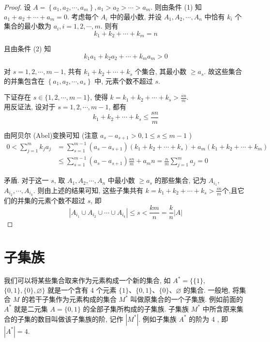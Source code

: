 \begin{proof}
	设 $A=\left\{a_{1}, a_{2}, \cdots, a_{m}\right\}, a_{1}>a_{2}>\cdots>a_{m}$. 则由条件 (1) 知 $a_{1}+a_{2}+\cdots+a_{m}=0$. 考虑每个 $A_{i}$ 中的最小数, 并设 $A_{1}, A_{2}, \cdots, A_{n}$ 中恰有 $k_{i}$ 个集合的最小数为 $a_{i}, i=1,2, \cdots, m$. 则有
	$$
		k_{1}+k_{2}+\cdots+k_{m}=n
	$$

	且由条件 (2) 知
	$$
		k_{1} a_{1}+k_{2} a_{2}+\cdots+k_{m} a_{m}>0
	$$

	对 $s=1,2, \cdots, m-1$, 共有 $k_{1}+k_{2}+\cdots+k_{s}$ 个集合, 其最小数 $\geqslant a_{s}$. 故这些集合的并集包含在 $\left\{a_{1}, a_{2}, \cdots, a_{s}\right\}$ 中, 元素个数不超过 $s$.

	下证存在 $s \in\{1,2, \cdots, m-1\}$, 使得 $k=k_{1}+k_{2}+\cdots+k_{s}>\frac{s n}{m}$.\\
	用反证法, 设对于 $s=1,2, \cdots, m-1$, 都有
	$$
		k_{1}+k_{2}+\cdots+k_{s} \leqslant \frac{s n}{m}
	$$

	由阿贝尔 (Abel)变换可知 (注意 $a_{s}-a_{s+1}>0,1 \leqslant s \leqslant m-1$ )
	$$
		\begin{aligned}
			0<\sum_{j=1}^{m} k_{j} a_{j} & =\sum_{s=1}^{m-1}\left(a_{s}-a_{s+1}\right)\left(k_{1}+k_{2}+\cdots+k_{s}\right)+a_{m}\left(k_{1}+k_{2}+\cdots+k_{m}\right) \\
			                             & \leqslant \sum_{s=1}^{m-1}\left(a_{s}-a_{s+1}\right) \frac{s n}{m}+a_{m} n=\frac{n}{m} \sum_{j=1}^{m} a_{j}=0
		\end{aligned}
	$$

	矛盾. 对于这一 $s$, 取 $A_{1}, A_{2}, \cdots, A_{n}$ 中最小数 $\geqslant a_{s}$ 的那些集合, 记为 $A_{i_{1}}$, $A_{i_{2}}, \cdots, A_{i_{k}}$. 则由上述的结果可知, 这些子集共有 $k=k_{1}+k_{2}+\cdots+k_{s}>\frac{s n}{m}$个,且它们的并集的元素个数不超过 $s$, 即
	$$
		\left|A_{i_{1}} \cup A_{i_{2}} \cup \cdots \cup A_{i_{k}}\right| \leqslant s<\frac{k m}{n}=\frac{k}{n}|A|
	$$
\end{proof}

\section{子集族}
我们可以将某些集合取来作为元素构成一个新的集合, 如 $A^{*}=\{\{1\}$, $\{0,1\},\{0\}, \varnothing\}$ 就是一个含有 4 个元素 $\{1\} 、\{0,1\} 、\{0\} 、 \varnothing$ 的集合. 一般地, 将集合 $M$ 的若干子集作为元素构成的集合 $M^{*}$ 叫做原集合的一个子集族. 例如前面的 $A^{*}$ 就是二元集 $A=\{0,1\}$ 的全部子集所构成的子集族. 子集族 $M^{*}$ 中所含原来集合的子集的数目叫做该子集族的阶, 记作 $\left|M^{*}\right|$. 例如子集族 $A^{*}$ 的阶为 4 , 即 $\left|A^{*}\right|=4$.

